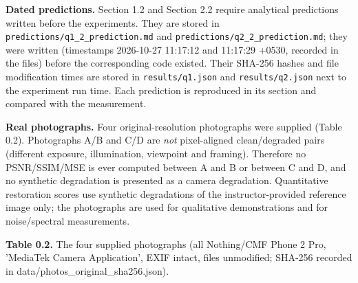 \documentclass[10pt,a4paper]{article}
\begin{document}
\textbf{Dated predictions.} Section 1.2 and Section 2.2 require analytical predictions written before the experiments. They are stored in \texttt{predictions/\allowbreak{}q1\_\allowbreak{}2\_\allowbreak{}prediction.\allowbreak{}md} and \texttt{predictions/\allowbreak{}q2\_\allowbreak{}2\_\allowbreak{}prediction.\allowbreak{}md}; they were written (timestamps 2026-10-27 11:17:12 and 11:17:29 +0530, recorded in the files) before the corresponding code existed. Their SHA-256 hashes and file modification times are stored in \texttt{results/\allowbreak{}q1.\allowbreak{}json} and \texttt{results/\allowbreak{}q2.\allowbreak{}json} next to the experiment run time. Each prediction is reproduced in its section and compared with the measurement.

\textbf{Real photographs.} Four original-resolution photographs were supplied (Table 0.2). Photographs A/B and C/D are \textit{not} pixel-aligned clean/degraded pairs (different exposure, illumination, viewpoint and framing). Therefore no PSNR/SSIM/MSE is ever computed between A and B or between C and D, and no synthetic degradation is presented as a camera degradation. Quantitative restoration scores use synthetic degradations of the instructor-provided reference image only; the photographs are used for qualitative demonstrations and for noise/spectral measurements.

\begin{table}[H]\centering\footnotesize{\small\textbf{Table 0.2.} The four supplied photographs (all Nothing/CMF Phone 2 Pro, 'MediaTek Camera Application', EXIF intact, files unmodified; SHA-256 recorded in data/photos\_original\_sha256.json).\par}\vskip 3pt
\end{table}
\end{document}
